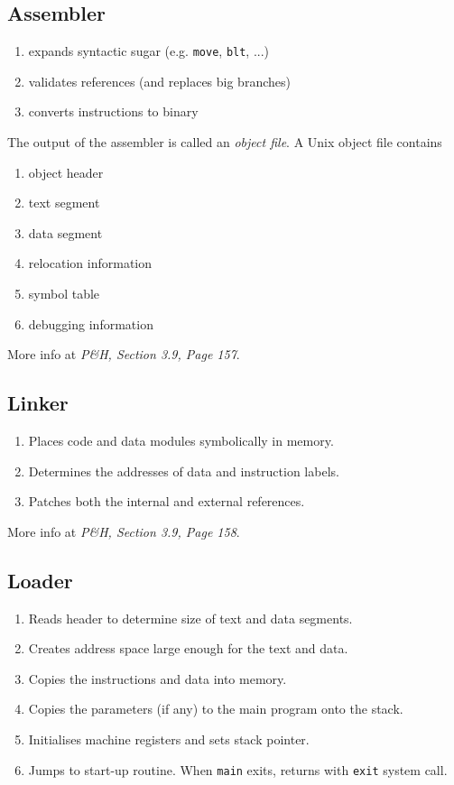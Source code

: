 \documentclass{article}
\newcommand{\T}[1]{\texttt{#1}}
\begin{document}
\subsection{Assembler}
\begin{enumerate}
	\item expands syntactic sugar (e.g. \T{move}, \T{blt}, ...)
	\item validates references (and replaces big branches)
	\item converts instructions to binary
\end{enumerate}
The output of the assembler is called an \emph{object file}. A Unix object file contains
\begin{enumerate}
	\item object header
	\item text segment
	\item data segment
	\item relocation information
	\item symbol table
	\item debugging information
\end{enumerate}
More info at \emph{P\&H, Section 3.9, Page 157}.
\subsection{Linker}
\begin{enumerate}
	\item Places code and data modules symbolically in memory.
	\item Determines the addresses of data and instruction labels.
	\item Patches both the internal and external references.
\end{enumerate}
More info at \emph{P\&H, Section 3.9, Page 158}.
\subsection{Loader}
\begin{enumerate}
	\item Reads header to determine size of text and data segments.
	\item Creates address space large enough for the text and data.
	\item Copies the instructions and data into memory.
	\item Copies the parameters (if any) to the main program onto the stack.
	\item Initialises machine registers and sets stack pointer.
	\item Jumps to start-up routine. When \T{main} exits, returns with \T{exit} system call.
\end{enumerate}
\end{document}
